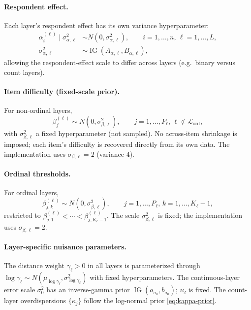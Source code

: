 \documentclass[11pt]{article}
\DeclareMathOperator{\IG}{IG}
\begin{document}
\paragraph{Respondent effect.}
Each layer's respondent effect has its own variance hyperparameter:
\begin{align}
    \alpha_i^{(\ell)}\mid\sigma_{\alpha,\ell}^2
    &\sim N(0,\sigma_{\alpha,\ell}^2),
    \qquad i=1,\dots,n,\,\ell=1,\dots,L,
    \label{eq:alpha-prior}\\
    \sigma_{\alpha,\ell}^2
    &\sim\IG(A_{\alpha,\ell},B_{\alpha,\ell}),
    \label{eq:sigma-alpha-prior}
\end{align}
allowing the respondent-effect scale to differ across layers (e.g.\ binary
versus count layers).

\paragraph{Item difficulty (fixed-scale prior).}
For non-ordinal layers,
\begin{equation}
    \beta_j^{(\ell)}\sim N(0,\sigma_{\beta,\ell}^2),
    \qquad j=1,\dots,P_\ell,\,\ell\notin\mathcal L_{\mathrm{ord}},
    \label{eq:beta-prior}
\end{equation}
with $\sigma_{\beta,\ell}^2$ a fixed hyperparameter (not sampled).  No
across-item shrinkage is imposed; each item's difficulty is recovered
directly from its own data.  The implementation uses
$\sigma_{\beta,\ell}=2$ (variance $4$).

\paragraph{Ordinal thresholds.}
For ordinal layers,
\begin{equation}
    \beta_{j,k}^{(\ell)}\sim N(0,\sigma_{\beta,\ell}^2),
    \qquad
    j=1,\dots,P_\ell,\,k=1,\dots,K_\ell-1,
    \label{eq:beta-thr-prior}
\end{equation}
restricted to $\beta_{j,1}^{(\ell)}<\cdots<\beta_{j,K_\ell-1}^{(\ell)}$.
The scale $\sigma_{\beta,\ell}^2$ is fixed; the implementation uses
$\sigma_{\beta,\ell}=2$.

\paragraph{Layer-specific nuisance parameters.}
The distance weight $\gamma_\ell>0$ in all layers is parameterized through
$\log\gamma_\ell\sim N(\mu_{\log\gamma_\ell},\sigma_{\log\gamma_\ell}^2)$
with fixed hyperparameters.  The continuous-layer error scale
$\sigma_0^2$ has an inverse-gamma prior $\IG(a_{\sigma_0},b_{\sigma_0})$;
$\nu_2$ is fixed.  The count-layer overdispersions $\{\kappa_j\}$ follow
the log-normal prior \eqref{eq:kappa-prior}.
\end{document}
